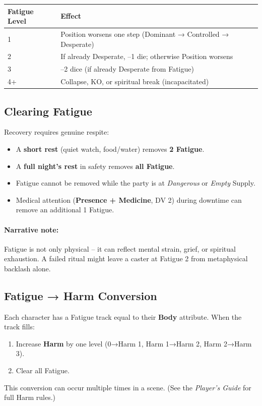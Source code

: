 \begin{tcolorbox}[title=Fatigue Progression, colback=white!97!gray, colframe=black!80!gray]
\begin{tabularx}{\textwidth}{lX}
\toprule
\textbf{Fatigue Level} & \textbf{Effect} \\
\midrule
1 & Position worsens one step (Dominant → Controlled → Desperate) \\
2 & If already Desperate, –1 die; otherwise Position worsens \\
3 & –2 dice (if already Desperate from Fatigue) \\
4+ & Collapse, KO, or spiritual break (incapacitated) \\
\bottomrule
\end{tabularx}
\end{tcolorbox}

\subsection{Clearing Fatigue}
\label{subsec:fatigue-clear}

Recovery requires genuine respite:
\begin{itemize}
  \item A \textbf{short rest} (quiet watch, food/water) removes \textbf{2 Fatigue}.
  \item A \textbf{full night’s rest} in safety removes \textbf{all Fatigue}.
  \item Fatigue cannot be removed while the party is at \textit{Dangerous} or \textit{Empty} Supply.
  \item Medical attention (\textbf{Presence + Medicine}, DV 2) during downtime can remove an additional 1 Fatigue.
\end{itemize}

\paragraph{Narrative note:}
Fatigue is not only physical – it can reflect mental strain, grief, or spiritual exhaustion. A failed ritual might leave a caster at Fatigue 2 from metaphysical backlash alone.

\subsection{Fatigue → Harm Conversion}
\label{subsec:fatigue-harm}

Each character has a Fatigue track equal to their \textbf{Body} attribute. When the track fills:
\begin{enumerate}
  \item Increase \textbf{Harm} by one level (0→Harm 1, Harm 1→Harm 2, Harm 2→Harm 3).
  \item Clear all Fatigue.
\end{enumerate}
This conversion can occur multiple times in a scene. (See the \textit{Player’s Guide} for full Harm rules.)

